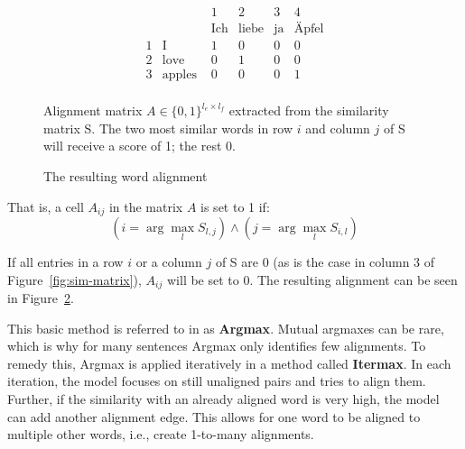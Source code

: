 \begin{figure}
\[
	\begin{array}{rl|c|c|c|c}
& &1 & 2 & 3 & 4\\
& &\text{Ich} & \text{liebe} & \text{ja} & \text{Äpfel} \\
\hline
1 & \text{I} & 1 & 0 & 0 & 0 \\ 
\hline
2 & \text{love} & 0 & 1 &0 & 0 \\
\hline
3 & \text{apples } & 0& 0 & 0 & 1\\
\end{array}
\]
\captionsetup{width=.6\linewidth}
\caption[Alignment matrix]{Alignment matrix $A \in \{0,1\}^{l_e \times l_f}$ extracted from the similarity matrix S. The two most similar words in row $i$ and column $j$ of S will receive a score of 1; the rest 0.}
\label{fig:al-matrix}
\end{figure}
\begin{figure}
\centering

    

\vspace*{1cm}

   
\caption{The resulting word alignment}
\label{fig:resulting-alignment}
\end{figure}


That is, a cell $A_{ij}$ in the matrix $A$ is set to 1 if:
\[
	(i= \arg \max_l S_{l,j}) \land (j=\arg\max_l S_{i,l})
\]


If all entries in a row $i$ or a column $j$ of S are 0 (as is the case in column 3 of Figure~\ref{fig:sim-matrix}), $A_{ij}$ will be set to 0.
The resulting alignment can be seen in Figure~\ref{fig:resulting-alignment}.

This basic method is referred to in \textcite{jalili-sabet-etal-2020-simalign} as \textbf{Argmax}. Mutual argmaxes can be rare, which is why for many sentences Argmax only identifies few alignments. 
To remedy this, Argmax is applied iteratively in a method called \textbf{Itermax}. 
In each iteration, the model focuses on still unaligned pairs and tries to align them. 
Further, if the similarity with an already aligned word is very high, the model can add another alignment edge. 
This allows for one word to be aligned to multiple other words, i.e., create 1-to-many alignments.


